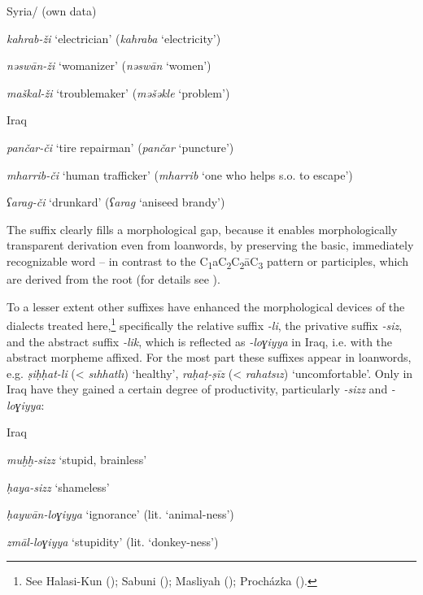 \documentclass[output=paper]{langsci/langscibook}
\begin{document}
\ea\label{kahrab}
Syria/ (own data)

\textit{kahrab-ži} ‘electrician’ (\textit{kahraba} ‘electricity’)

\textit{nəswān-ži} ‘womanizer’ (\textit{nəswān} ‘women’)

\textit{maškal-ži} ‘troublemaker’ (\textit{məšəkle} ‘problem’)
\z

\ea\label{pancar}
Iraq \citep[40--44]{Procházka-Eisl2018}

\textit{pančar-či} ‘tire repairman’ (\textit{pančar} ‘puncture’)

\textit{mharrib-či} ‘human trafficker’ (\textit{mharrib} ‘one who helps s.o. to escape’)

\textit{ʕarag-či} ‘drunkard’ (\textit{ʕarag} ‘aniseed brandy’)
\z

The suffix clearly fills a morphological gap, because it enables morphologically transparent {derivation} even from {loanwords}, by preserving the basic, immediately recognizable word – in contrast to the  C\textsubscript{1}aC\textsubscript{2}C\textsubscript{2}āC\textsubscript{3}{} pattern or participles, which are derived from the {root} (for details see \citealt{Procházka-Eisl2018}).

To a lesser extent other  suffixes have enhanced the morphological devices of the dialects treated here,\footnote{See Halasi-Kun (\citeyear[68--71]{Halasi-Kun1969}); Sabuni (\citeyear[168]{Sabuni1980}); Masliyah (\citeyear{Masliyah1996}); Procházka (\citeyear[186]{Procházka2002Cukurova}).} specifically the {relative} suffix \textit{-li}, the {privative} suffix \textit{-siz}, and the abstract suffix \textit{-lik}, which is reflected as \textit{-loɣiyya} in Iraq, i.e. with the  abstract morpheme affixed. For the most part these suffixes appear in  {loanwords}, e.g.  \textit{ṣiḥḥat-li} (<  \textit{sıhhatlı}) ‘healthy’, \textit{raḥaṭ-ṣīz} (<  \textit{rahatsız}) ‘uncomfortable’. Only in Iraq have they gained a certain degree of productivity, particularly \textit{-sizz} and \textit{-loɣiyya}:

\ea
Iraq \citep[293--294]{Masliyah1996} 

\textit{muḫḫ-sizz} ‘stupid, brainless’

\textit{ḥaya-sizz} ‘shameless’

\textit{ḥaywān-loɣiyya} ‘ignorance’ (lit. ‘animal-ness’)

\textit{zmāl-loɣiyya} ‘stupidity’ (lit. ‘donkey-ness’)
\z
\end{document}
